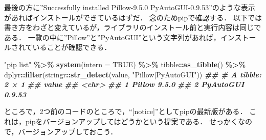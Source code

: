 \documentclass[
]{article}
\newenvironment{Shaded}{\begin{snugshade}}{\end{snugshade}}
\newcommand{\AttributeTok}[1]{\textcolor[rgb]{0.13,0.29,0.53}{#1}}
\newcommand{\ConstantTok}[1]{\textcolor[rgb]{0.56,0.35,0.01}{#1}}
\newcommand{\DocumentationTok}[1]{\textcolor[rgb]{0.56,0.35,0.01}{\textbf{\textit{#1}}}}
\newcommand{\FunctionTok}[1]{\textcolor[rgb]{0.13,0.29,0.53}{\textbf{#1}}}
\newcommand{\NormalTok}[1]{#1}
\newcommand{\SpecialCharTok}[1]{\textcolor[rgb]{0.81,0.36,0.00}{\textbf{#1}}}
\newcommand{\StringTok}[1]{\textcolor[rgb]{0.31,0.60,0.02}{#1}}
\begin{document}
最後の方に''Successfully installed Pillow-9.5.0 PyAutoGUI-0.9.53''のような表示があればインストールができているはずだ．
念のためpipで確認する．
以下では書き方をわざと変えているが，ライブラリのインストール前と実行内容は同じである．
一覧の中に''Pillow''と''PyAutoGUI''という文字列があれば，インストールされていることが確認できる．

\begin{Shaded}
\begin{Highlighting}[]
\StringTok{"pip list"} \SpecialCharTok{\%\textgreater{}\%}
  \FunctionTok{system}\NormalTok{(}\AttributeTok{intern =} \ConstantTok{TRUE}\NormalTok{) }\SpecialCharTok{\%\textgreater{}\%}
\NormalTok{  tibble}\SpecialCharTok{::}\FunctionTok{as\_tibble}\NormalTok{() }\SpecialCharTok{\%\textgreater{}\%}
\NormalTok{  dplyr}\SpecialCharTok{::}\FunctionTok{filter}\NormalTok{(stringr}\SpecialCharTok{::}\FunctionTok{str\_detect}\NormalTok{(value, }\StringTok{"Pillow|PyAutoGUI"}\NormalTok{))}
\DocumentationTok{\#\# \# A tibble: 2 × 1}
\DocumentationTok{\#\#   value               }
\DocumentationTok{\#\#   \textless{}chr\textgreater{}               }
\DocumentationTok{\#\# 1 Pillow          9.5.0 }
\DocumentationTok{\#\# 2 PyAutoGUI       0.9.53}
\end{Highlighting}
\end{Shaded}

ところで，2つ前のコードのところで，``{[}notice{]}''としてpipの最新版がある．
これは，pipをバージョンアップしてはどうかという提案である．
せっかくなので，バージョンアップしておこう．
\end{document}
